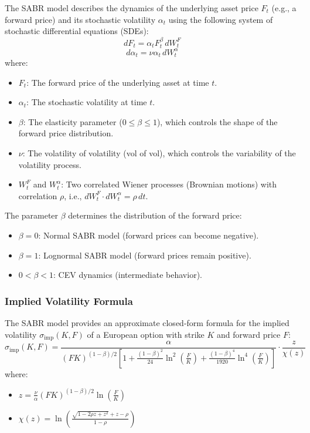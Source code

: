 \documentclass[11pt, oneside, a4paper, titlepage]{report}
\begin{document}
The SABR model describes the dynamics of the underlying asset price \( F_t \) (e.g., a forward price) and its stochastic volatility \( \alpha_t \) using the following system of stochastic differential equations (SDEs):
\[
dF_t = \alpha_t F_t^\beta \, dW_t^F
\]
\[
d\alpha_t = \nu \alpha_t \, dW_t^\alpha
\]
where:
\begin{itemize}
    \item \( F_t \): The forward price of the underlying asset at time \( t \).
    \item \( \alpha_t \): The stochastic volatility at time \( t \).
    \item \( \beta \): The elasticity parameter (\( 0 \leq \beta \leq 1 \)), which controls the shape of the forward price distribution.
    \item \( \nu \): The volatility of volatility (vol of vol), which controls the variability of the volatility process.
    \item \( W_t^F \) and \( W_t^\alpha \): Two correlated Wiener processes (Brownian motions) with correlation \( \rho \), i.e., \( dW_t^F \cdot dW_t^\alpha = \rho \, dt \).
\end{itemize}

The parameter \( \beta \) determines the distribution of the forward price:
\begin{itemize}
    \item \( \beta = 0 \): Normal SABR model (forward prices can become negative).
    \item \( \beta = 1 \): Lognormal SABR model (forward prices remain positive).
    \item \( 0 < \beta < 1 \): CEV dynamics (intermediate behavior).
\end{itemize}

\subsubsection{Implied Volatility Formula}

The SABR model provides an approximate closed-form formula for the implied volatility \( \sigma_{\text{imp}}(K, F) \) of a European option with strike \( K \) and forward price \( F \):
\[
\sigma_{\text{imp}}(K, F) = \frac{\alpha}{(F K)^{(1-\beta)/2} \left[ 1 + \frac{(1-\beta)^2}{24} \ln^2\left(\frac{F}{K}\right) + \frac{(1-\beta)^4}{1920} \ln^4\left(\frac{F}{K}\right) \right]} \cdot \frac{z}{\chi(z)}
\]
where:
\begin{itemize}
    \item \( z = \frac{\nu}{\alpha} (F K)^{(1-\beta)/2} \ln\left(\frac{F}{K}\right) \)
    \item \( \chi(z) = \ln\left( \frac{\sqrt{1 - 2 \rho z + z^2} + z - \rho}{1 - \rho} \right) \)
\end{itemize}
\vspace{0.5cm}
\end{document}
